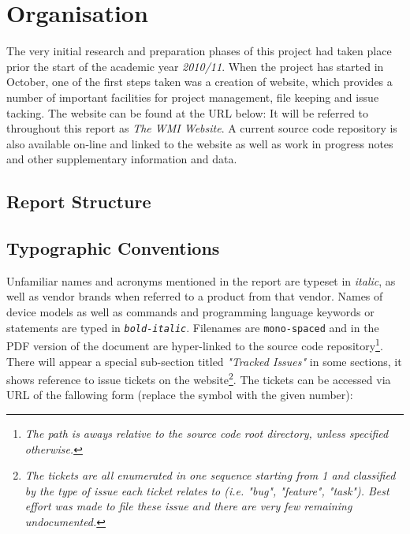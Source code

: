 
\section{Organisation}

  The very initial research and preparation phases of this project had taken place
 prior the start of the academic year \emph{2010/11}. When the project has started
 in October, one of the first steps taken was a creation of website, which provides
 a number of important facilities for project management, file keeping and issue
 tacking. The website can be found at the URL below:
 {}
 It will be referred to throughout this report as \emph{The WMI Website}. A current
 source code repository is also available on-line and linked to the website as well
 as work in progress notes and other supplementary information and data.

\subsection{Report Structure}

\subsection{Typographic Conventions}

  Unfamiliar names and acronyms mentioned in the report are typeset in \emph{italic},
 as well as vendor brands when referred to a product from that vendor. Names of device
 models as well as commands and programming language keywords or statements are typed
 in \emph{\texttt{bold-italic}}. Filenames are \texttt{mono-spaced} and in the PDF
 version of the document are hyper-linked to the source code repository\footnote{%
 \emph{The path is aways relative to the source code root directory, unless specified
 otherwise.}}. There will appear a special sub-section titled \emph{"Tracked Issues"}
 in some sections, it shows reference to issue tickets on the website\footnote{\emph{%
 The tickets are all enumerated in one sequence starting from 1 and classified by the
 type of issue each ticket relates to (i.e. "bug", "feature", "task"). Best effort
 was made to file these issue and there are very few remaining undocumented.}}.
 The tickets can be accessed via URL of the fallowing form (replace the 
 symbol with the given number): 
